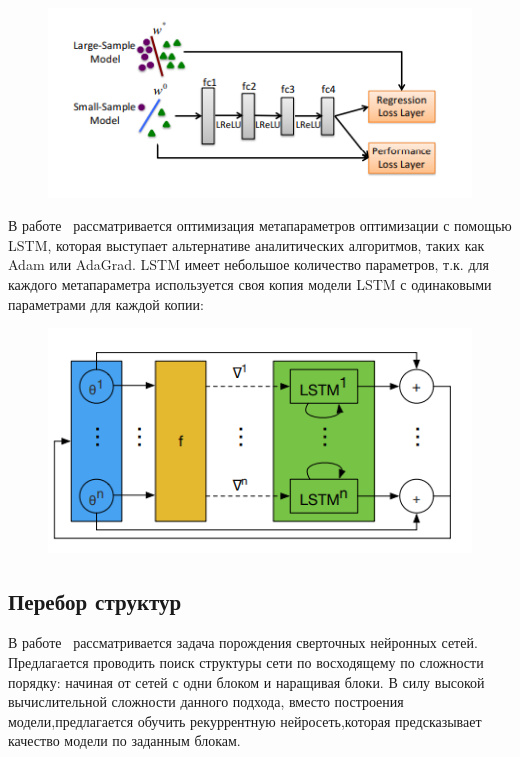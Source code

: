 \begin{figure}[H]
\includegraphics[width=\textwidth]{./plots/arch_review_figs/l2l_scheme.png}
\end{figure}

В работе~\cite{l2l_by_gd_gd} рассматривается оптимизация метапараметров оптимизации с помощью LSTM, которая выступает альтернативе аналитических алгоритмов, таких как Adam или AdaGrad. LSTM имеет небольшое количество параметров, т.к. для каждого метапараметра используется своя копия модели LSTM с одинаковыми параметрами для каждой копии:
\begin{figure}[H]
\includegraphics[width=\textwidth]{./plots/arch_review_figs/l2lbygd.png}
\end{figure}




\subsection{Перебор структур}
В работе~\cite{search_smbo} рассматривается задача порождения сверточных нейронных сетей. Предлагается проводить поиск структуры сети по восходящему по сложности порядку: начиная от сетей с одни блоком и наращивая блоки. В силу высокой вычислительной сложности данного подхода, вместо построения модели,предлагается обучить рекуррентную нейросеть,которая предсказывает качество модели по заданным блокам. 


